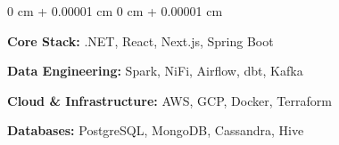 \documentclass[10pt, letterpaper]{article}
\newenvironment{onecolentry}{
    \begin{adjustwidth}{
        0 cm + 0.00001 cm
    }{
        0 cm + 0.00001 cm
    }
}{
    \end{adjustwidth}
} %
\begin{document}
        
        \begin{onecolentry}
            \textbf{Core Stack:} .NET, React, Next.js, Spring Boot

            \vspace{0.1 cm}

            \textbf{Data Engineering:} Spark, NiFi, Airflow, dbt, Kafka

            \vspace{0.1 cm}

            \textbf{Cloud \& Infrastructure:} AWS, GCP, Docker, Terraform

            \vspace{0.1 cm}

            \textbf{Databases:} PostgreSQL, MongoDB, Cassandra, Hive
        \end{onecolentry}



    

    
\end{document}
